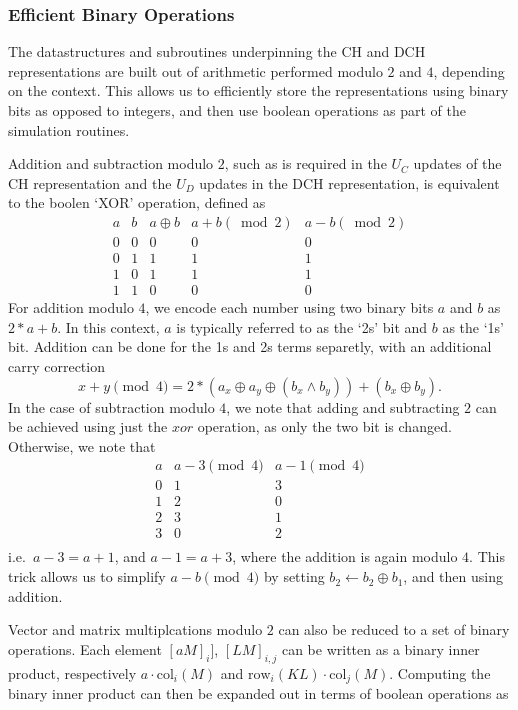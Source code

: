 \subsubsection*{Efficient Binary Operations}\label{sec:binary_ops}
The datastructures and subroutines underpinning the CH and DCH representations are built out of arithmetic performed modulo $2$ and $4$, depending on the context. This allows us to efficiently store the representations using binary bits as opposed to integers, and then use boolean operations as part of the simulation routines.\par
Addition and subtraction modulo $2$, such as is required in the $U_{C}$ updates of the CH representation and the $U_{D}$ updates in the DCH representation, is equivalent to the boolen `XOR' operation, defined as
\[
\begin{array}{c|c|c|c|c}
a & b & a\oplus b & a+b\left(\bmod{2}\right)&a-b\left(\bmod{2}\right)\\
\hline
0 & 0 & 0 & 0 & 0\\
0 & 1 & 1  & 1 & 1\\
1 & 0 & 1 & 1 & 1\\
1 & 1 & 0 & 0 & 0
\end{array}
\label{eq:xor}
\]
For addition modulo $4$, we encode each number using two binary bits $a$ and $b$ as $2*a+b$. In this context, $a$ is typically referred to as the `2s' bit and $b$ as the `1s' bit. Addition can be done for the  1s and 2s terms separetly, with an additional carry correction
\[x+y\pmod{4} = 2*\left(a_{x}\oplus a_{y} \oplus (b_{x}\wedge b_{y})\right) + \left(b_{x}\oplus b_{y}\right).\]
In the case of subtraction modulo $4$, we note that adding and subtracting $2$ can be achieved using just the $xor$ operation, as only the two bit is changed. Otherwise, we note that
\[
\begin{array}{c|c|c}
a  & a-3 \pmod{4} & a-1\pmod{4}\\
\hline
0 & 1 & 3 \\
1 & 2 & 0 \\
2 & 3 & 1 \\
3 & 0 & 2 \\
\end{array}
\]
i.e.\ $a-3=a+1$, and $a-1=a+3$, where the addition is again modulo $4$. This trick allows us to simplify $a-b\pmod{4}$ by setting $b_{2}\gets b_{2}\oplus b_{1}$, and then using addition.\par
Vector and matrix multiplcations modulo $2$ can also be reduced to a set of binary operations. Each element $[aM]_{i}]$, $[LM]_{i,j}$ can be written as a binary inner product, respectively $a\cdot \text{col}_{i}(M)$ and $\text{row}_{i}(KL)\cdot\text{col}_{j}(M)$. Computing the binary inner product can then be expanded out in terms of boolean operations as
